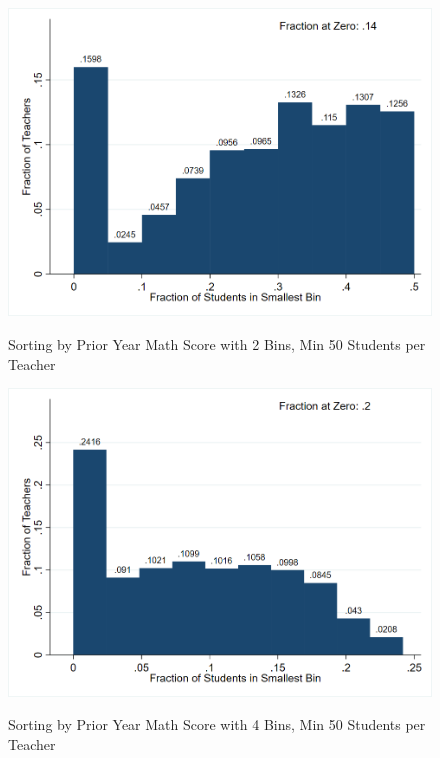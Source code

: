 \documentclass[letterpaper,12pt]{article}
\begin{document}
\begin{figure}[ht]
    \centering
    \caption{Sorting by Prior Year Math Score with 2 Bins, Min 50 Students per Teacher}
    \includegraphics[width=\textwidth]{figures/ELA_Sorting_2_50.png}
    \label{fig: Math sort 2 50}
\end{figure}

\begin{figure}[ht]
    \centering
    \caption{Sorting by Prior Year Math Score with 4 Bins, Min 50 Students per Teacher}
    \includegraphics[width=\textwidth]{figures/ELA_Sorting_4_50.png}
    \label{fig: Math sort 4 50}
\end{figure}
\end{document}

